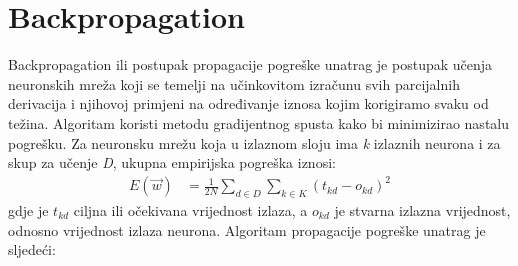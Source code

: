 \section{Backpropagation}\label{sec:backpropagation}
Backpropagation ili postupak propagacije pogreške unatrag je postupak učenja neuronskih mreža koji se temelji na učinkovitom izračunu svih parcijalnih derivacija
i njihovoj primjeni na određivanje iznosa kojim korigiramo svaku od težina.
Algoritam koristi metodu gradijentnog spusta kako bi minimizirao nastalu pogrešku.
Za neuronsku mrežu koja u izlaznom sloju ima \textit{k} izlaznih neurona i za skup za učenje \textit{D}, ukupna empirijska pogreška iznosi:
\begin{align*}
    E(\vec{w}) &= \frac{1}{2N} \sum_{d \in D} \sum_{k \in K} (t_{kd} - o_{kd})^2
\end{align*}
gdje je $t_{kd}$ ciljna ili očekivana vrijednost izlaza, a $o_{kd}$ je stvarna izlazna vrijednost, odnosno vrijednost izlaza neurona.
Algoritam propagacije pogreške unatrag je sljedeći:
